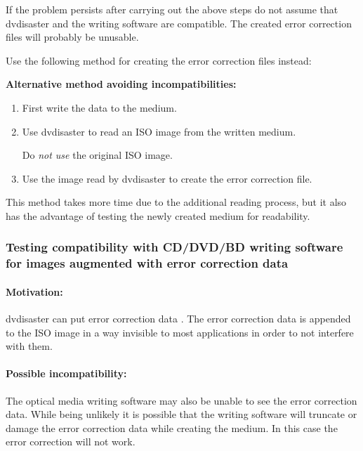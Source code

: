 \bigskip

\textcolor{dkred}{If the problem persists after carrying out the above steps do not
 assume that dvdisaster and the writing software are compatible. The created error 
correction files will probably be unusable.}

\bigskip

Use the following method for creating the error correction files instead: 

\newpage

{\bf Alternative method avoiding incompatibilities:}

\begin{enumerate}
\item First write the data to the medium.
\item Use dvdisaster to read an ISO image from the written medium.

Do {\em not use} the original ISO image.
\item Use the  image read by dvdisaster to create the error correction file.
\end{enumerate}

This method takes more time due to the additional reading process, but 
it also has the advantage of testing the newly created medium for readability. 

\newpage
\subsubsection{Testing compatibility with CD/DVD/BD writing software for images augmented with error correction data}
\label{howto-compat-augment}

\paragraph{Motivation:} dvdisaster can put error correction 
data . The error 
correction data is appended to the ISO image in a way invisible to most applications 
in order to not interfere with them.

\paragraph{Possible incompatibility:} The optical media writing software 
may also be unable to see the error correction data. While being unlikely 
it is possible that the writing software will truncate or damage the error 
correction data while creating the medium. In this case the error correction will not work.


